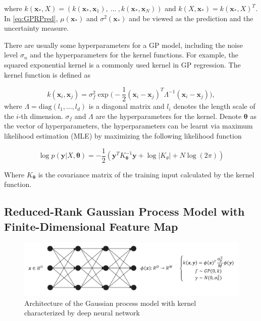 where $k(\bm{x}_*, X) = (k(\bm{x}_*, \bm{x}_1),~\dots~,k(\bm{x}_*, \bm{x}_N))$ and $k(X, \bm{x}_*) = k(\bm{x}_*, X)^T$. In \eqref{eq:GPRPred}, $\mu(\bm{x}_*)$ and $\sigma^2(\bm{x}_*)$ and be viewed as the prediction and the uncertainty measure.

There are usually some hyperparameters for a GP model, including the noise level $\sigma_n$ and the hyperparameters for the kernel functions. For example, the squared exponential kernel is a commonly used kernel in GP regression. The kernel function is defined as

\begin{equation}
    \label{eq:GaussianCovarianceFunction}
    k(\bm{x}_i, \bm{x}_j) = \sigma_f^2 \exp\Big(-\frac{1}{2}(\bm{x}_i - \bm{x}_j)^T\Lambda^{-1}(\bm{x}_i - \bm{x}_j)\Big),
\end{equation}
where $\Lambda = \mathrm{diag}(l_1, \dots, l_d)$ is a diagonal matrix and $l_i$ denotes the length scale of the $i$-th dimension. $\sigma_f$ and $\Lambda$ are the hyperparameters for the kernel. Denote $\bm{\theta}$ as the vector of hyperparameters, the hyperparameters can be learnt via maximum likelihood estimation (MLE) by maximizing the following likelihood function

\begin{equation}
    \label{eq:GPloglikelihood}
    \log p(\bm{y} | X, \bm{\theta}) = -\frac{1}{2}(\bm{y}^T K_{\bm{\theta}}^{-1} \bm{y} + \log |K_{\theta}| + N \log(2 \pi))
\end{equation}

Where $K_{\bm{\theta}}$ is the covariance matrix of the training input calculated by the kernel function.

\subsection{Reduced-Rank Gaussian Process Model with Finite-Dimensional Feature Map}\label{sec:NNGP}

\begin{figure}[!htb]
    \centering
    \includegraphics[width=\columnwidth]{./img/nn1.pdf}
    \caption{Architecture of the Gaussian process model with kernel characterized by deep neural network}
    \label{fig:NNGP}
\end{figure}

